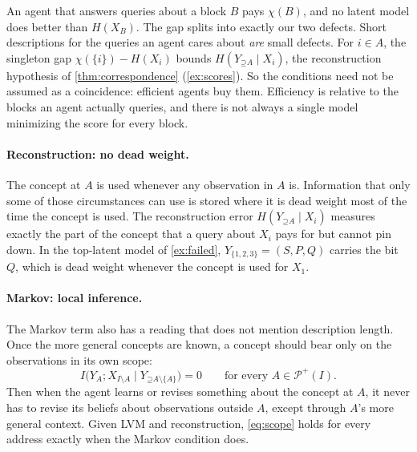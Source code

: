 \documentclass[11pt]{article}
\newcommand{\PI}{\mathcal{P}^{+}(I)}
\newcommand{\Up}{\mathord{\supseteq}}
\begin{document}
An agent that answers queries about a block $B$ pays $\chi(B)$, and no
latent model does better than $H(X_B)$. The gap splits into exactly our two
defects. Short descriptions for the queries an agent cares about \emph{are}
small defects. For $i\in A$, the singleton gap $\chi(\{i\})-H(X_i)$ bounds
$H(Y_{\Up A}\mid X_i)$, the reconstruction hypothesis of
\cref{thm:correspondence} (\cref{ex:scores}).
So the conditions need not be assumed as a coincidence: efficient agents buy
them. Efficiency is relative to the blocks an agent actually queries, and there is
not always a single model minimizing the score for every block.

\paragraph{Reconstruction: no dead weight.}
The concept at $A$ is used whenever any observation in $A$ is. Information
that only some of those circumstances can use is stored where it is dead
weight most of the time the concept is used. The reconstruction error
$H(Y_{\Up A}\mid X_i)$ measures exactly the part of the concept that a query
about $X_i$ pays for but cannot pin down. In the top-latent model of
\cref{ex:failed}, $Y_{\{1,2,3\}}=(S,P,Q)$ carries the bit $Q$, which is dead
weight whenever the concept is used for $X_1$.

\paragraph{Markov: local inference.}
The Markov term also has a reading that does not mention description length.
Once the more general concepts are known, a concept should bear only on the
observations in its own scope:
\begin{equation}
 I\bigl(Y_A;X_{I\setminus A}\mid Y_{\Up A\setminus\{A\}}\bigr)=0
 \qquad\text{for every }A\in\PI.
 \label{eq:scope}
\end{equation}
Then when the agent learns or revises something about the concept at $A$, it
never has to revise its beliefs about observations outside $A$, except
through $A$'s more general context. Given LVM and reconstruction,
\eqref{eq:scope} holds for every address exactly when the Markov
condition does.
\end{document}
